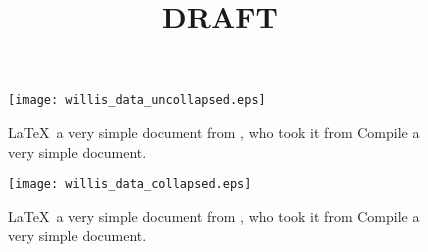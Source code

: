 \documentclass{article}
\begin{document}
\ifdraft
	\title{DRAFT}
	\maketitle
\else
\frontmatter
\fi

	\tableofcontents

\ifdraft
\else
\mainmatter
\fi

\pagebreak
\begin{figure}[htbp]
 \begin{center}
    \texttt{[image: willis\_data\_uncollapsed.eps]}
     \caption{\LaTeX\ a very simple document from \cite{Slater2012}, who took it from \cite{Willis1995} Compile a very simple document.}
     \label{fig:MyFirstLaTeX}
 \end{center}
\end{figure}

\begin{figure}[htbp]
 \begin{center}
    \texttt{[image: willis\_data\_collapsed.eps]}
     \caption{\LaTeX\ a very simple document from \cite{Slater2012}, who took it from \cite{Willis1995} Compile a very simple document.}
     \label{fig:MyFirstLaTeX}
 \end{center}
\end{figure}

\pagebreak
\ifdraft
 	\printbibliography
\else
	\backmatter
\fi
\end{document}
